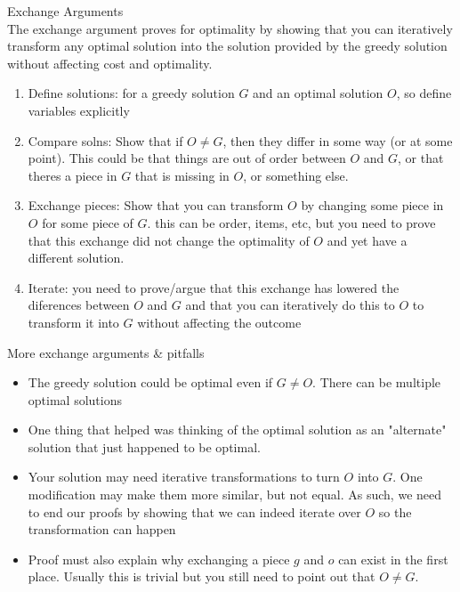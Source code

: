 \documentclass[journal, letterpaper]{IEEEtran}
\begin{document}
\begin{theory}{Exchange Arguments}\\
    The exchange argument proves for optimality by showing that you can iteratively
    transform any optimal solution into the solution provided by the greedy solution
    without affecting cost and optimality.

    \begin{enumerate}
        \item Define solutions: for a greedy solution $G$ and an optimal solution $O$, so
            define variables explicitly
        \item Compare solns: Show that if $O \neq G$, then they differ in some way (or at
            some point). This could be that things are out of order between $O$ and $G$,
            or that theres a piece in $G$ that is missing in $O$, or something else.
        \item Exchange pieces: Show that you can transform $O$ by changing some piece in
            $O$ for some piece of $G$. this can be order, items, etc, but you need to
            prove that this exchange did not change the optimality of $O$ and yet have a
            different solution.
        \item Iterate: you need to prove/argue that this exchange has lowered the
            diferences between $O$ and $G$ and that you can iteratively do this to $O$ to
            transform it into $G$ without affecting the outcome
    \end{enumerate}
\end{theory}

\begin{aside}{More exchange arguments \& pitfalls}\\
    \begin{itemize}
        \item The greedy solution could be optimal even if $G \neq O$. There can be
            multiple optimal solutions
        \item One thing that helped was thinking of the optimal solution as an "alternate"
            solution that just happened to be optimal.
        \item Your solution may need iterative transformations to turn $O$ into $G$. One
            modification may make them more similar, but not equal. As such, we need to
            end our proofs by showing that we can indeed iterate over $O$ so the
            transformation can happen
        \item Proof must also explain why exchanging a piece $g$ and $o$ can exist in the
            first place. Usually this is trivial but you still need to point out that $O
            \neq G$.
    \end{itemize}
\end{aside}
\end{document}
